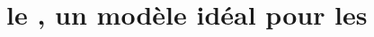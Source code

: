 \documentclass[\main/main.tex]{subfiles}
\begin{document}
\chapter{
    \label{chap:zebra}
    le \pz{}, un modèle idéal pour les \hcss{}
    }








\end{document}
